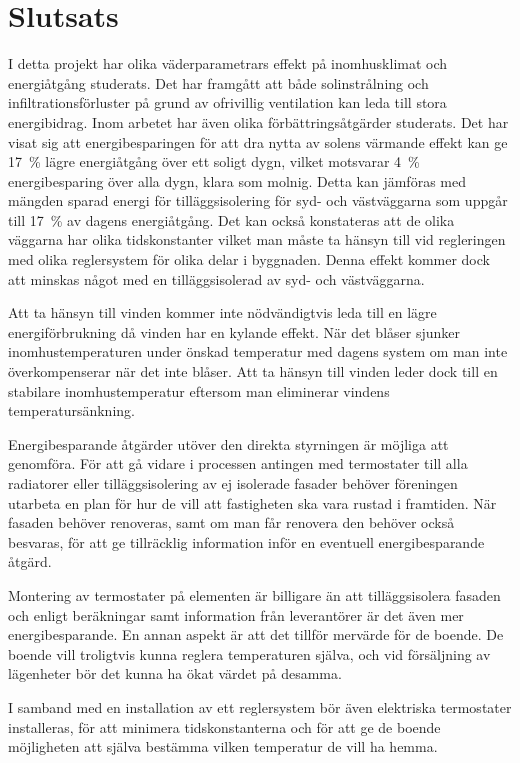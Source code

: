 \chapter{Slutsats}


I detta projekt har olika väderparametrars effekt på inomhusklimat och energiåtgång studerats.
Det har framgått att både solinstrålning och infiltrationsförluster på grund av ofrivillig
ventilation kan leda till stora energibidrag. Inom arbetet har även olika förbättringsåtgärder
studerats. Det har visat sig att energibesparingen för att dra nytta av solens värmande effekt kan ge 17~\% lägre energiåtgång över ett soligt dygn, vilket motsvarar 4~\% energibesparing över alla dygn, klara som molnig. Detta kan jämföras med mängden sparad energi för tilläggsisolering för syd- och västväggarna som uppgår till 17~\% av dagens energiåtgång. Det kan också konstateras att de olika väggarna har olika tidskonstanter vilket man måste ta hänsyn till vid regleringen med olika reglersystem för olika delar i byggnaden. Denna effekt kommer dock att minskas något med en tilläggsisolerad av syd- och västväggarna.

Att ta hänsyn till vinden kommer inte nödvändigtvis leda till en lägre energiförbrukning då vinden har en kylande effekt. När det blåser sjunker inomhustemperaturen under önskad temperatur med dagens system om man inte överkompenserar när det inte blåser. Att ta hänsyn till vinden leder dock till en stabilare inomhustemperatur eftersom man eliminerar vindens temperatursänkning.

Energibesparande åtgärder utöver den direkta styrningen är möjliga att genomföra. För att gå vidare i processen antingen med termostater till alla radiatorer eller tilläggsisolering av ej isolerade fasader behöver föreningen utarbeta en plan för hur de vill att fastigheten ska vara rustad i framtiden. När fasaden behöver renoveras, samt om man får renovera den behöver också besvaras, för att ge tillräcklig information inför en eventuell energibesparande åtgärd. 

Montering av termostater på elementen är billigare än att tilläggsisolera fasaden och enligt beräkningar samt information från leverantörer är det även mer energibesparande. En annan aspekt är att det tillför mervärde för de boende. De boende vill troligtvis kunna reglera temperaturen själva, och vid försäljning av lägenheter bör det kunna ha ökat värdet på desamma.

I samband med en installation av ett reglersystem bör även elektriska termostater installeras, för att minimera tidskonstanterna och för att ge de boende möjligheten att själva bestämma vilken temperatur de vill ha hemma.

